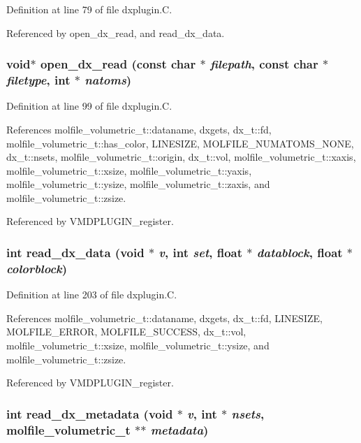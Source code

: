 Definition at line 79 of file dxplugin.C.

Referenced by open\_\-dx\_\-read, and read\_\-dx\_\-data.
\subsubsection{\setlength{\rightskip}{0pt plus 5cm}void$\ast$ open\_\-dx\_\-read (const char $\ast$ {\em filepath}, const char $\ast$ {\em filetype}, int $\ast$ {\em natoms})\hspace{0.3cm}{\tt  [static]}}\label{dxplugin_8C_a3}




Definition at line 99 of file dxplugin.C.

References molfile\_\-volumetric\_\-t::dataname, dxgets, dx\_\-t::fd, molfile\_\-volumetric\_\-t::has\_\-color, LINESIZE, MOLFILE\_\-NUMATOMS\_\-NONE, dx\_\-t::nsets, molfile\_\-volumetric\_\-t::origin, dx\_\-t::vol, molfile\_\-volumetric\_\-t::xaxis, molfile\_\-volumetric\_\-t::xsize, molfile\_\-volumetric\_\-t::yaxis, molfile\_\-volumetric\_\-t::ysize, molfile\_\-volumetric\_\-t::zaxis, and molfile\_\-volumetric\_\-t::zsize.

Referenced by VMDPLUGIN\_\-register.
\subsubsection{\setlength{\rightskip}{0pt plus 5cm}int read\_\-dx\_\-data (void $\ast$ {\em v}, int {\em set}, float $\ast$ {\em datablock}, float $\ast$ {\em colorblock})\hspace{0.3cm}{\tt  [static]}}\label{dxplugin_8C_a5}




Definition at line 203 of file dxplugin.C.

References molfile\_\-volumetric\_\-t::dataname, dxgets, dx\_\-t::fd, LINESIZE, MOLFILE\_\-ERROR, MOLFILE\_\-SUCCESS, dx\_\-t::vol, molfile\_\-volumetric\_\-t::xsize, molfile\_\-volumetric\_\-t::ysize, and molfile\_\-volumetric\_\-t::zsize.

Referenced by VMDPLUGIN\_\-register.
\subsubsection{\setlength{\rightskip}{0pt plus 5cm}int read\_\-dx\_\-metadata (void $\ast$ {\em v}, int $\ast$ {\em nsets}, {\bf molfile\_\-volumetric\_\-t} $\ast$$\ast$ {\em metadata})\hspace{0.3cm}{\tt  [static]}}\label{dxplugin_8C_a4}




